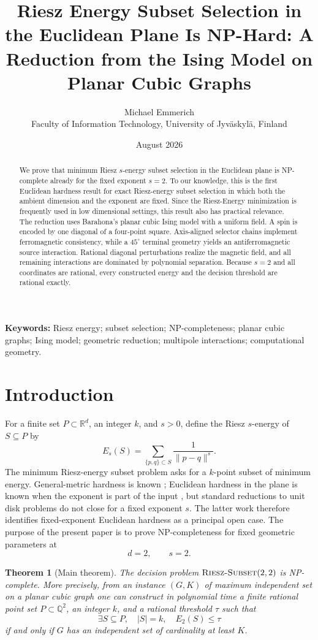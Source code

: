 \documentclass[12pt,a4paper]{article}
\title{Riesz Energy Subset Selection in the Euclidean Plane Is NP-Hard: A Reduction from the Ising Model on Planar Cubic Graphs}
\author{Michael Emmerich\\[0.75ex]\small Faculty of Information Technology, University of Jyv\"askyl\"a, Finland}
\date{August 2026}
\newtheorem{theorem}{Theorem}[section]
\newcommand{\R}{\mathbb{R}}
\newcommand{\Q}{\mathbb{Q}}
\newcommand{\norm}[1]{\lVert #1\rVert}
\newcommand{\RSSP}{\text{\normalfont\scshape Riesz-Subset}}
\begin{document}
\maketitle

\begin{abstract}
We prove that minimum Riesz $s$-energy subset selection in the Euclidean plane is NP-complete already for the fixed exponent $s=2$.  To our knowledge, this is the first Euclidean hardness result for exact Riesz-energy subset selection in which both the ambient dimension and the exponent are fixed. Since the Riesz-Energy minimization is frequently used in low dimensional settings, this result also has practical relevance.   The reduction uses Barahona's planar cubic Ising model with a uniform field.  A spin is encoded by one diagonal of a four-point square.  Axis-aligned selector chains implement ferromagnetic consistency, while a $45^\circ$ terminal geometry yields an antiferromagnetic source interaction.  Rational diagonal perturbations realize the magnetic field, and all remaining interactions are dominated by polynomial separation.  Because $s=2$ and all coordinates are rational, every constructed energy and the decision threshold are rational exactly. 
\end{abstract}

\noindent\textbf{Keywords:} Riesz energy; subset selection; NP-completeness; planar cubic graphs; Ising model; geometric reduction; multipole interactions; computational geometry.

\section{Introduction}\label{sec:intro}

For a finite set $P\subset\R^d$, an integer $k$, and $s>0$, define the Riesz $s$-energy of $S\subseteq P$ by
\[
 E_s(S)=\sum_{\{p,q\}\subset S}\frac1{\norm{p-q}^s}.
\]
The minimum Riesz-energy subset problem asks for a $k$-point subset of minimum energy.  General-metric hardness is known \cite{Pereverdieva2025}; Euclidean hardness in the plane is known when the exponent is part of the input  \cite{EmmerichPereverdievaDeutz2026}, but standard reductions to unit disk problems do not close for a fixed exponent $s$.  The latter work therefore identifies fixed-exponent Euclidean hardness as a principal open case.  The purpose of the present paper is to prove NP-completeness for fixed geometric parameters at
\[
 d=2,\qquad s=2.
\]

\begin{theorem}[Main theorem]\label{thm:main}
The decision problem $\RSSP(2,2)$ is NP-complete.  More precisely, from an instance $(G,K)$ of maximum independent set on a planar cubic graph one can construct in polynomial time a finite rational point set $P\subset\Q^2$, an integer $k$, and a rational threshold $\tau$ such that
\[
 \exists S\subseteq P,\quad |S|=k,\quad E_2(S)\le\tau
\]
if and only if $G$ has an independent set of cardinality at least $K$.
\end{theorem}
\end{document}
